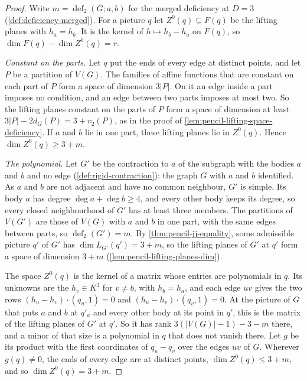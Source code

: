 \begin{proof}
  \leanok
  Write $m = \operatorname{def}_2(G; a, b)$ for the merged deficiency at
  $D = 3$ (\cref{def:deficiency-merged}). For a picture $q$ let
  $Z^0(q) \subseteq F(q)$ be the lifting planes with $h_a = h_b$. It is
  the kernel of $h \mapsto h_b - h_a$ on $F(q)$, so
  $\dim F(q) - \dim Z^0(q) = r$.

  \emph{Constant on the parts.} Let $q$ put the ends of every edge at
  distinct points, and let $P$ be a partition of $V(G)$. The families of
  affine functions that are constant on each part of $P$ form a space of
  dimension $3|P|$. On it an edge inside a part imposes no condition, and
  an edge between two parts imposes at most two. So the lifting planes
  constant on the parts of $P$ form a space of dimension at least
  $3|P| - 2d_G(P) = 3 + v_2(P)$, as in the proof of
  \cref{lem:pencil-lifting-space-deficiency}. If $a$ and $b$ lie in one
  part, these lifting planes lie in $Z^0(q)$. Hence
  $\dim Z^0(q) \ge 3 + m$.

  \emph{The polynomial.} Let $G'$ be the contraction to $a$ of the
  subgraph with the bodies $a$ and $b$ and no edge
  (\cref{def:rigid-contraction}): the graph $G$ with $a$ and $b$
  identified. As $a$ and $b$ are not adjacent and have no common
  neighbour, $G'$ is simple. Its body $a$ has degree
  $\deg a + \deg b \ge 4$, and every other body keeps its degree, so every
  closed neighbourhood of $G'$ has at least three members. The partitions
  of $V(G')$ are those of $V(G)$ with $a$ and $b$ in one part, with the
  same edges between parts, so $\operatorname{def}_2(G') = m$. By
  \cref{thm:pencil-jj-equality}, some admissible picture $q'$ of $G'$
  has $\dim L_{G'}(q') = 3 + m$, so the
  lifting planes of $G'$ at $q'$ form a space of dimension $3 + m$
  (\cref{lem:pencil-lifting-planes-dim}).

  The space $Z^0(q)$ is the kernel of a matrix whose entries are
  polynomials in $q$. Its unknowns are the $h_v \in K^3$ for $v \neq b$,
  with $h_b = h_a$, and each edge $uv$ gives the two rows
  $(h_u - h_v) \cdot (q_u, 1) = 0$ and $(h_u - h_v) \cdot (q_v, 1) = 0$.
  At the picture of $G$ that puts $a$ and $b$ at $q'_a$ and every other
  body at its point in $q'$, this is the matrix of the lifting planes of
  $G'$ at $q'$. So it has rank $3(|V(G)| - 1) - 3 - m$ there, and a minor
  of that size is a polynomial in $q$ that does not vanish there. Let $g$
  be its product with the first coordinates of $q_u - q_v$ over the edges
  $uv$ of $G$. Wherever $g(q) \neq 0$, the ends of every edge are at
  distinct points, $\dim Z^0(q) \le 3 + m$, and so
  $\dim Z^0(q) = 3 + m$.


\end{proof}
